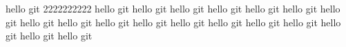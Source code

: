 hello git 2222222222
hello git
hello git
hello git
hello git
hello git
hello git
hello git
hello git
hello git
hello git
hello git
hello git
hello git
hello git
hello git
hello git
hello git
hello git


